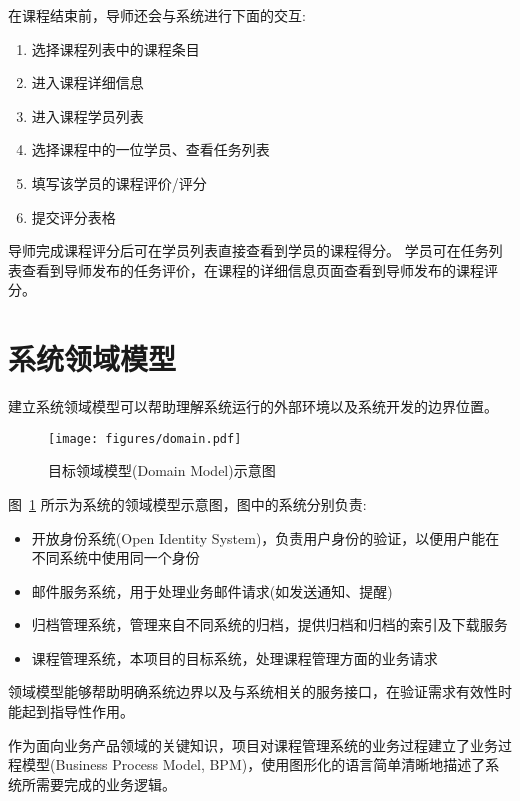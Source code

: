 在课程结束前，导师还会与系统进行下面的交互:

\begin{enumerate}
  \item 选择课程列表中的课程条目
  \item 进入课程详细信息
  \item 进入课程学员列表
  \item 选择课程中的一位学员、查看任务列表
  \item 填写该学员的课程评价/评分
  \item 提交评分表格
\end{enumerate}

导师完成课程评分后可在学员列表直接查看到学员的课程得分。 学员可在任务列表查看到导师发布的任务评价，在课程的详细信息页面查看到导师发布的课程评分。

\section{系统领域模型}

建立系统领域模型可以帮助理解系统运行的外部环境以及系统开发的边界位置。

\begin{figure}[!h]
  \begin{center}
    \texttt{[image: figures/domain.pdf]}
    \caption{目标领域模型(Domain Model)示意图\label{DomainModel}}
  \end{center}
\end{figure}

图~\ref{DomainModel} 所示为系统的领域模型示意图，图中的系统分别负责:

\begin{itemize}
  \item 开放身份系统(Open Identity System)，负责用户身份的验证，以便用户能在不同系统中使用同一个身份
  \item 邮件服务系统，用于处理业务邮件请求(如发送通知、提醒)
  \item 归档管理系统，管理来自不同系统的归档，提供归档和归档的索引及下载服务
  \item 课程管理系统，本项目的目标系统，处理课程管理方面的业务请求
\end{itemize}

领域模型能够帮助明确系统边界以及与系统相关的服务接口，在验证需求有效性时能起到指导性作用。

作为面向业务产品领域的关键知识，项目对课程管理系统的业务过程建立了业务过程模型(Business Process Model, BPM)，使用图形化的语言简单清晰地描述了系统所需要完成的业务逻辑。

